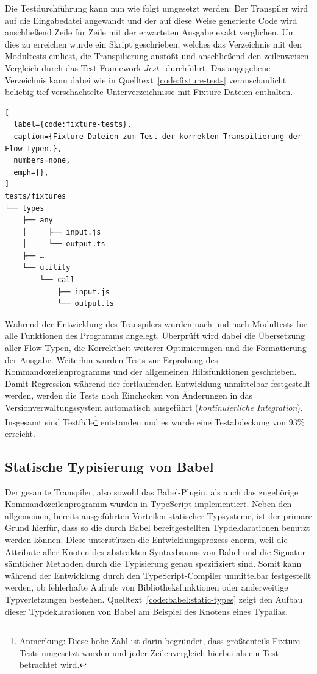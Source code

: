 {Die Testdurchführung kann nun wie folgt umgesetzt werden: Der Transpiler wird auf die Eingabedatei angewandt und der auf diese Weise generierte Code wird anschließend Zeile für Zeile mit der erwarteten Ausgabe exakt verglichen. Um dies zu erreichen wurde ein Skript geschrieben, welches das Verzeichnis mit den Modultests einliest, die Transpilierung anstößt und anschließend den zeilenweisen Vergleich durch das Test-Framework \textit{Jest}~\autocite{SOFTWARE:JEST} durchführt. Das angegebene Verzeichnis kann dabei wie in Quelltext~\ref{code:fixture-tests} veranschaulicht beliebig tief verschachtelte Unterverzeichnisse mit Fixture-Dateien enthalten.

\begin{lstlisting}[
  label={code:fixture-tests},
  caption={Fixture-Dateien zum Test der korrekten Transpilierung der Flow-Typen.},
  numbers=none,
  emph={},
]
tests/fixtures
└── types
    ├── any
    │     ├── input.js
    │     └── output.ts
    ├── …
    └── utility
        └── call
            ├── input.js
            └── output.ts
\end{lstlisting}

Während der Entwicklung des Transpilers wurden nach und nach Modultests für alle Funktionen des Programms angelegt. Überprüft wird dabei die Übersetzung aller Flow-Typen, die Korrektheit weiterer Optimierungen und die Formatierung der Ausgabe. Weiterhin wurden Tests zur Erprobung des Kommandozeilenprogramms und der allgemeinen Hilfsfunktionen geschrieben. Damit Regression während der fortlaufenden Entwicklung unmittelbar festgestellt werden, werden die Tests nach Einchecken von Änderungen in das Versionverwaltungssystem automatisch ausgeführt (\textit{kontinuierliche Integration}). Insgesamt sind \numberOfTests Testfälle\footnote{Anmerkung: Diese hohe Zahl ist darin begründet, dass größtenteils Fixture-Tests umgesetzt wurden und jeder Zeilenvergleich hierbei als ein Test betrachtet wird.} entstanden und es wurde eine Testabdeckung von 93\% erreicht.

\subsection{Statische Typisierung von Babel}

Der gesamte Transpiler, also sowohl das Babel-Plugin, als auch das zugehörige Kommandozeilenprogramm wurden in TypeScript implementiert. Neben den allgemeinen, bereits ausgeführten Vorteilen statischer Typsysteme, ist der primäre Grund hierfür, dass so die durch Babel bereitgestellten Typdeklarationen benutzt werden können. Diese unterstützen die Entwicklungsprozess enorm, weil die Attribute aller Knoten des abstrakten Syntaxbaums von Babel und die Signatur sämtlicher Methoden durch die Typisierung genau spezifiziert sind. Somit kann während der Entwicklung durch den TypeScript-Compiler unmittelbar festgestellt werden, ob fehlerhafte Aufrufe von Bibliotheksfunktionen oder anderweitige Typverletzungen bestehen. Quelltext~\ref{code:babel:static-types} zeigt den Aufbau dieser Typdeklarationen von Babel am Beispiel des Knotens eines Typalias.

}
